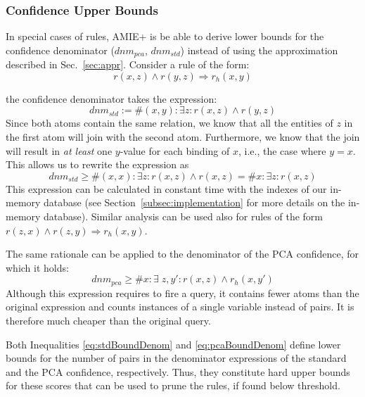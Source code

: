 \subsubsection{Confidence Upper Bounds}
In special cases of rules, AMIE+ is be able to derive lower bounds for the confidence denominator ($dnm_{pca}$, $dnm_{std}$) instead of using the approximation described in Sec.~\ref{sec:appr}.
Consider a rule of the form:
$$ r(x,z) \wedge r(y,z) \Rightarrow r_h(x,y) $$

the confidence denominator takes the expression:
$$
dnm_{std} := \#(x,y): \exists z: r(x,z) \wedge r(y,z)
$$
Since both atoms contain the same relation, we know that all the entities of $z$ in the first atom
will join with the second atom. Furthermore,
we know that the join will result in \emph{at least} one $y$-value for each binding of $x$, i.e., the case where $y=x$. This allows us to rewrite
the expression as
\begin{equation}
dnm_{std} \ge \#(x,x): \exists z:  r(x,z) \wedge r(x,z) = \#x: \exists z:  r(x,z)  \label{eq:stdBoundDenom}
\end{equation}
This expression can be calculated in constant time with the indexes of our in-memory database (see Section~\ref{subsec:implementation} for more details on the in-memory database).
Similar analysis can be used also for rules of the form $r(z,x) \wedge r(z,y) \Rightarrow r_h(x,y) $.

The same rationale can be applied to the denominator of the PCA confidence, for which it holds:
\begin{equation} \label{eq:pcaBoundDenom}
dnm_{pca} \ge \#x: \exists \;z, y': r(x,z) \wedge r_h(x,y')
\end{equation}
Although this expression requires to fire a query, it contains fewer atoms than the original expression and counts instances
of a single variable instead of pairs. It is therefore much cheaper than the original query.

Both Inequalities \ref{eq:stdBoundDenom} and \ref{eq:pcaBoundDenom}
define lower bounds for the number of pairs in the denominator expressions of the standard
and the PCA confidence, respectively. Thus, they constitute hard upper bounds for these scores that can be used to prune the rules, if found below threshold.








